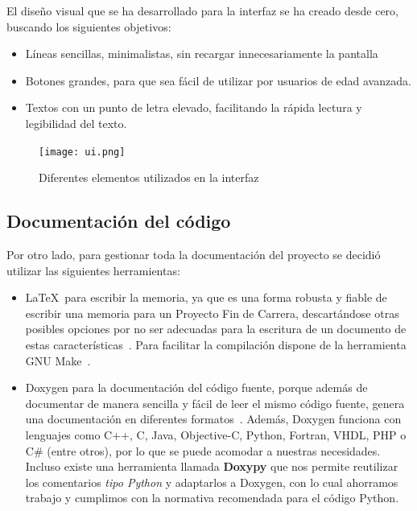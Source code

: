 El diseño visual que se ha desarrollado para la interfaz se ha creado desde cero, buscando los siguientes objetivos:
\begin{itemize}
    \item Líneas sencillas, minimalistas, sin recargar innecesariamente la pantalla
    \item Botones grandes, para que sea fácil de utilizar por usuarios de edad avanzada.
    \item Textos con un punto de letra elevado, facilitando la rápida lectura y legibilidad del texto.
\end{itemize}

\begin{figure}[h]
  \label{interfaz}
  \begin{center}
    \texttt{[image: ui.png]}
  \end{center}
  \caption{Diferentes elementos utilizados en la interfaz}
\end{figure}

\subsection{Documentación del código}

Por otro lado, para gestionar toda la documentación del proyecto se decidió utilizar las siguientes herramientas:
\begin{itemize}
    \item \LaTeX\ para escribir la memoria, ya que es una forma robusta y fiable de escribir una memoria para
            un Proyecto Fin de Carrera, descartándose otras posibles opciones por no ser adecuadas para la escritura
            de un documento de estas características~\cite{mitt04}. Para facilitar la compilación dispone de la herramienta
            GNU Make~\cite{pdf:make}.
    \item Doxygen para la documentación del código fuente, porque además de documentar de manera sencilla y fácil
            de leer el mismo código fuente, genera una documentación en diferentes formatos~\cite{website:doxygen}. Además,
            Doxygen funciona con lenguajes como C++, C, Java, Objective-C, Python, Fortran, VHDL, PHP o C\#
            (entre otros), por lo que se puede acomodar a nuestras necesidades. Incluso existe una
            herramienta llamada \textbf{Doxypy} que nos permite reutilizar los comentarios \emph{tipo Python}
            y adaptarlos a Doxygen, con lo cual ahorramos trabajo y cumplimos con la normativa recomendada para el código Python.
\end{itemize}


